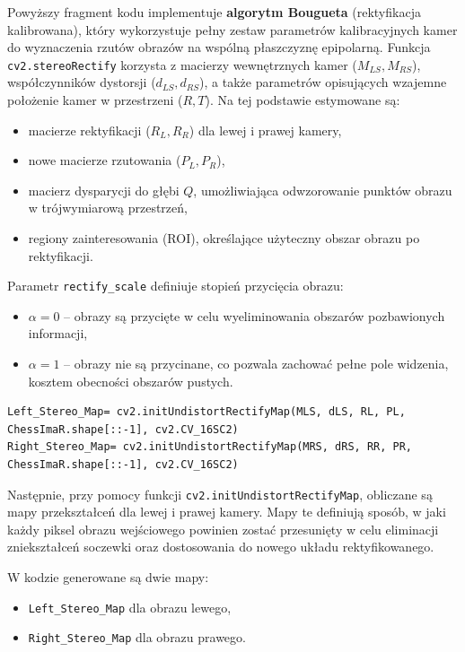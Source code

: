\documentclass[magisterska]{pracadypl}
\begin{document}
Powyższy fragment kodu implementuje \textbf{algorytm Bougueta} (rektyfikacja kalibrowana), który wykorzystuje pełny zestaw parametrów kalibracyjnych kamer do wyznaczenia rzutów obrazów na wspólną płaszczyznę epipolarną. 
Funkcja \texttt{cv2.stereoRectify} korzysta z macierzy wewnętrznych kamer ($M_{LS}, M_{RS}$), współczynników dystorsji ($d_{LS}, d_{RS}$), a także parametrów opisujących wzajemne położenie kamer w przestrzeni ($R,T$). 
Na tej podstawie estymowane są:

\begin{itemize}
    \item macierze rektyfikacji ($R_L,R_R$) dla lewej i prawej kamery,
    \item nowe macierze rzutowania ($P_L,P_R$),
    \item macierz dysparycji do głębi $Q$, umożliwiająca odwzorowanie punktów obrazu w trójwymiarową przestrzeń,
    \item regiony zainteresowania (ROI), określające użyteczny obszar obrazu po rektyfikacji.
\end{itemize}

Parametr \texttt{rectify\_scale} definiuje stopień przycięcia obrazu:

\begin{itemize}
    \item $\alpha = 0$ – obrazy są przycięte w celu wyeliminowania obszarów pozbawionych informacji,
    \item $\alpha = 1$ – obrazy nie są przycinane, co pozwala zachować pełne pole widzenia, kosztem obecności obszarów pustych.
\end{itemize}

\begin{lstlisting}[style=mypython]
Left_Stereo_Map= cv2.initUndistortRectifyMap(MLS, dLS, RL, PL, ChessImaR.shape[::-1], cv2.CV_16SC2)
Right_Stereo_Map= cv2.initUndistortRectifyMap(MRS, dRS, RR, PR, ChessImaR.shape[::-1], cv2.CV_16SC2)
\end{lstlisting}

Następnie, przy pomocy funkcji \texttt{cv2.initUndistortRectifyMap}, obliczane są mapy przekształceń dla lewej i prawej kamery. 
Mapy te definiują sposób, w jaki każdy piksel obrazu wejściowego powinien zostać przesunięty w celu eliminacji zniekształceń soczewki oraz dostosowania do nowego układu rektyfikowanego.

W kodzie generowane są dwie mapy:

\begin{itemize}
    \item \texttt{Left\_Stereo\_Map} dla obrazu lewego,
    \item \texttt{Right\_Stereo\_Map} dla obrazu prawego.
\end{itemize}
\end{document}
